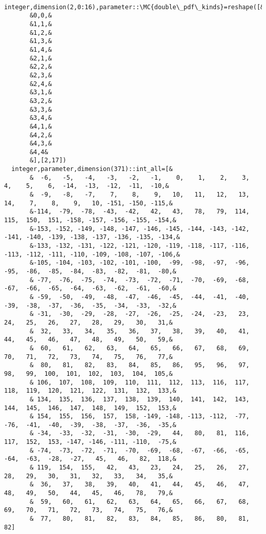 \begin{Verbatim}
  integer,dimension(2,0:16),parameter::\MC{double\_pdf\_kinds}=reshape([&
       &0,0,&
       &1,1,&
       &1,2,&
       &1,3,&
       &1,4,&
       &2,1,&
       &2,2,&
       &2,3,&
       &2,4,&
       &3,1,&
       &3,2,&
       &3,3,&
       &3,4,&
       &4,1,&
       &4,2,&
       &4,3,&
       &4,4&
       &],[2,17])
  integer,parameter,dimension(371)::int_all=[&
       &  -6,   -5,   -4,   -3,   -2,   -1,    0,    1,    2,    3,    4,    5,    6,  -14,  -13,  -12,  -11,  -10,&
       &  -9,   -8,   -7,    7,    8,    9,   10,   11,   12,   13,   14,    7,    8,    9,   10, -151, -150, -115,&
       &-114,  -79,  -78,  -43,  -42,   42,   43,   78,   79,  114,  115,  150,  151, -158, -157, -156, -155, -154,&
       &-153, -152, -149, -148, -147, -146, -145, -144, -143, -142, -141, -140, -139, -138, -137, -136, -135, -134,&
       &-133, -132, -131, -122, -121, -120, -119, -118, -117, -116, -113, -112, -111, -110, -109, -108, -107, -106,&
       &-105, -104, -103, -102, -101, -100,  -99,  -98,  -97,  -96,  -95,  -86,  -85,  -84,  -83,  -82,  -81,  -80,&
       & -77,  -76,  -75,  -74,  -73,  -72,  -71,  -70,  -69,  -68,  -67,  -66,  -65,  -64,  -63,  -62,  -61,  -60,&
       & -59,  -50,  -49,  -48,  -47,  -46,  -45,  -44,  -41,  -40,  -39,  -38,  -37,  -36,  -35,  -34,  -33,  -32,&
       & -31,  -30,  -29,  -28,  -27,  -26,  -25,  -24,  -23,   23,   24,   25,   26,   27,   28,   29,   30,   31,&
       &  32,   33,   34,   35,   36,   37,   38,   39,   40,   41,   44,   45,   46,   47,   48,   49,   50,   59,&
       &  60,   61,   62,   63,   64,   65,   66,   67,   68,   69,   70,   71,   72,   73,   74,   75,   76,   77,&
       &  80,   81,   82,   83,   84,   85,   86,   95,   96,   97,   98,   99,  100,  101,  102,  103,  104,  105,&
       & 106,  107,  108,  109,  110,  111,  112,  113,  116,  117,  118,  119,  120,  121,  122,  131,  132,  133,&
       & 134,  135,  136,  137,  138,  139,  140,  141,  142,  143,  144,  145,  146,  147,  148,  149,  152,  153,&
       & 154,  155,  156,  157,  158, -149, -148, -113, -112,  -77,  -76,  -41,  -40,  -39,  -38,  -37,  -36,  -35,&
       & -34,  -33,  -32,  -31,  -30,  -29,   44,   80,   81,  116,  117,  152,  153, -147, -146, -111, -110,  -75,&
       & -74,  -73,  -72,  -71,  -70,  -69,  -68,  -67,  -66,  -65,  -64,  -63,  -28,  -27,   45,   46,   82,  118,&
       & 119,  154,  155,   42,   43,   23,   24,   25,   26,   27,   28,   29,   30,   31,   32,   33,   34,   35,&
       &  36,   37,   38,   39,   40,   41,   44,   45,   46,   47,   48,   49,   50,   44,   45,   46,   78,   79,&
       &  59,   60,   61,   62,   63,   64,   65,   66,   67,   68,   69,   70,   71,   72,   73,   74,   75,   76,&
       &  77,   80,   81,   82,   83,   84,   85,   86,   80,   81,   82]


\end{Verbatim}
